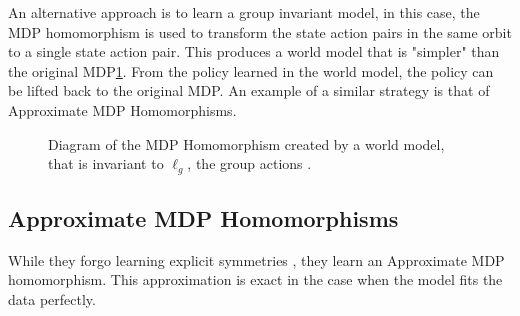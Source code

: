 An alternative approach is to learn a group invariant model, in this case, the MDP homomorphism is used to transform the state action pairs in the same orbit to a single state action pair. This produces a world model that is "simpler" than the original MDP\ref{fig:invariant_world_model}. From the policy learned in the world model, the policy can be lifted back to the original MDP. An example of a similar strategy is that of Approximate MDP Homomorphisms.
\begin{figure}[h]
	\centering
	\caption{Diagram of the MDP Homomorphism created by a world model, that is invariant to $\ell_g$,  the group actions .}
	\label{fig:invariant_world_model}
\end{figure}
\subsection{Approximate MDP Homomorphisms}
While they forgo learning explicit symmetries \cite{van2020plannable}, they learn an Approximate MDP homomorphism. This approximation is exact in the case when the model fits the data perfectly.

